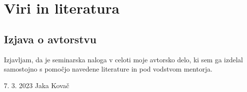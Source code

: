 \documentclass[12pt]{article}
\begin{document}
\newpage

\begingroup
\makeatletter
        \section{Viri in literatura}
        \nocite{*}
        \printbibliography[heading=none]
\makeatother
\endgroup
\newpage

\begin{samepage}
    \thispagestyle{empty}
    \section*{Izjava o avtorstvu}
    Izjavljam, da je seminarska naloga v celoti moje avtorsko delo, ki sem ga 
    izdelal samostojno s pomoĉjo navedene literature in pod vodstvom mentorja.

    \vfill
    
    7. 3. 2023 \hfill Jaka Kovač
    
    \vspace{3 cm}
\end{samepage}
\end{document}
